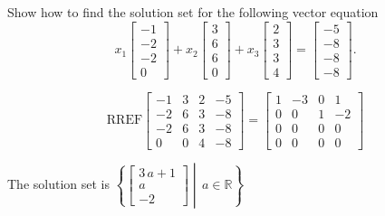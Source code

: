 
\begin{exerciseStatement}


Show how to find the solution set for the following vector equation \[ x_{1} \left[\begin{array}{c}
-1 \\
-2 \\
-2 \\
0
\end{array}\right] + x_{2} \left[\begin{array}{c}
3 \\
6 \\
6 \\
0
\end{array}\right] + x_{3} \left[\begin{array}{c}
2 \\
3 \\
3 \\
4
\end{array}\right] = \left[\begin{array}{c}
-5 \\
-8 \\
-8 \\
-8
\end{array}\right] .\]


\end{exerciseStatement}
    
\begin{exerciseAnswer} 
\[\mathrm{RREF} \left[\begin{array}{ccc|c}
-1 & 3 & 2 & -5 \\
-2 & 6 & 3 & -8 \\
-2 & 6 & 3 & -8 \\
0 & 0 & 4 & -8
\end{array}\right]  =  \left[\begin{array}{ccc|c}
1 & -3 & 0 & 1 \\
0 & 0 & 1 & -2 \\
0 & 0 & 0 & 0 \\
0 & 0 & 0 & 0
\end{array}\right] \]

The solution set is \( \left\{ \left[\begin{array}{c}
3 \, a + 1 \\
a \\
-2
\end{array}\right] \middle|\,a\in\mathbb{R}\right\} \)


\end{exerciseAnswer}
    
